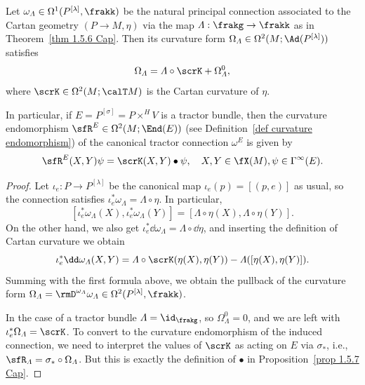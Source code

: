 
\begin{cor}\label{cor 1.5.7 Cap}
    Let $\omega_\varLambda\in\Omega^1(P^{[\lambda]},\frakk)$ be the natural principal connection associated to the Cartan geometry $(P\to M,\eta)$ via the map $\varLambda:\frakg\to\frakk$ as in Theorem~\ref{thm 1.5.6 Cap}. Then its curvature form $\Omega_\varLambda\in\Omega^2(M;\Ad(P^{[\lambda]}))$ satisfies 
    \[\Omega_\varLambda=\varLambda\circ\scrK+\Omega^0_\varLambda,\]
    where $\scrK\in\Omega^2(M;\calT M)$ is the Cartan curvature of $\eta$.

    In particular, if $E=P^{[\sigma]}=P\times^H V$ is a tractor bundle, then the curvature endomorphism $\sfR^E\in\Omega^2(M;\End(E))$ (see Definition~\ref{def curvature endomorphism}) of the canonical tractor connection $\omega^E$ is given by 
    \[\sfR^E(X,Y)\psi=\scrK(X,Y)\bullet \psi,\quad X,Y\in\fX(M),\psi\in\Gamma^\infty(E).\]
\end{cor}
\begin{proof}
    Let $\iota_e:P\to P^{[\lambda]}$ be the canonical map $\iota_e(p)=[(p,e)]$ as usual, so the connection satisfies $\iota_e^\ast\omega_\varLambda=\varLambda\circ\eta$. In particular,
    \[[\iota_e^\ast\omega_\varLambda(X),\iota_e^\ast\omega_\varLambda(Y)]=[\varLambda\circ\eta(X),\varLambda\circ\eta(Y)].\]
    On the other hand, we also get $\iota_e^\ast\dd\omega_\varLambda=\varLambda\circ\dd\eta$, and inserting the definition of Cartan curvature we obtain 
    \[\iota_e^\ast\dd\omega_\varLambda(X,Y)=\varLambda\circ\scrK(\eta(X),\eta(Y))-\varLambda([\eta(X),\eta(Y)]).\]
    Summing with the first formula above, we obtain the pullback of the curvature form $\Omega_\varLambda=\rmD^{\omega_\varLambda}\omega_\varLambda\in \Omega^2(P^{[\lambda]},\frakk)$.

    In the case of a tractor bundle $\varLambda=\id_\frakg$, so $\Omega^0_\varLambda=0$, and we are left with $\iota_e^\ast\Omega_\varLambda=\scrK$. To convert to the curvature endomorphism of the induced connection, we need to interpret the values of $\scrK$ as acting on $E$ via $\sigma_\ast$, i.e., $\sfR_\varLambda=\sigma_\ast\circ \Omega_\varLambda$. But this is exactly the definition of $\bullet$ in Proposition~\ref{prop 1.5.7 Cap}.
\end{proof}

